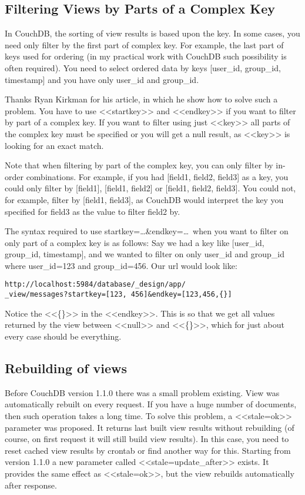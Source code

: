 \subsection{Filtering Views by Parts of a Complex Key}

In CouchDB, the sorting of view results is based upon the key. In some cases, you need only filter by the first part of complex key. For example, the last part of keys used for ordering (in my practical work with CouchDB such possibility is often required). You need to select ordered data by keys [user\_id, group\_id, timestamp] and you have only user\_id and group\_id.

Thanks Ryan Kirkman for his article\cite{couchdb_filtering_views}, in which he show how to solve such a problem. You have to use <<startkey>> and <<endkey>> if you want to filter by part of a complex key. If you want to filter using just <<key>> all parts of the complex key must be specified or you will get a null result, as <<key>> is looking for an exact match.

Note that when filtering by part of the complex key, you can only filter by in-order combinations. For example, if you had [field1, field2, field3] as a key, you could only filter by [field1], [field1, field2] or [field1, field2, field3]. You could not, for example, filter by [field1, field3], as CouchDB would interpret the key you specified for field3 as the value to filter field2 by.

The syntax required to use startkey=\dots\&endkey=\dots~when you want to filter on only part of a complex key is as follows:
Say we had a key like [user\_id, group\_id, timestamp], and we wanted to filter on only user\_id and group\_id where user\_id=123 and group\_id=456. Our url would look like:

\begin{lstlisting}
http://localhost:5984/database/_design/app/
_view/messages?startkey=[123, 456]&endkey=[123,456,{}]
\end{lstlisting}

Notice the <<\{\}>> in the <<endkey>>. This is so that we get all values returned by the view between <<null>> and <<\{\}>>, which for just about every case should be everything.

\subsection{Rebuilding of views}

Before CouchDB version 1.1.0 there was a small problem existing. View was automatically rebuilt on every request. If you have a huge number of documents, then such operation takes a long time. To solve this problem, a <<stale=ok>> parameter was proposed. It returns last built view results without rebuilding (of course, on first request it will still build view results). In this case, you need to reset cached view results by crontab or find another way for this. Starting from version 1.1.0 a new parameter called <<stale=update\_after>> exists. It provides the same effect as <<stale=ok>>, but the view rebuilds automatically after response.

